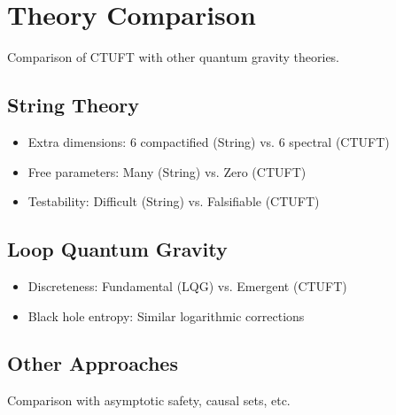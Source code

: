 \section{Theory Comparison}
\label{sec:theory_comparison}

Comparison of CTUFT with other quantum gravity theories.

\subsection{String Theory}

\begin{itemize}
    \item Extra dimensions: 6 compactified (String) vs. 6 spectral (CTUFT)
    \item Free parameters: Many (String) vs. Zero (CTUFT)
    \item Testability: Difficult (String) vs. Falsifiable (CTUFT)
\end{itemize}

\subsection{Loop Quantum Gravity}

\begin{itemize}
    \item Discreteness: Fundamental (LQG) vs. Emergent (CTUFT)
    \item Black hole entropy: Similar logarithmic corrections
\end{itemize}

\subsection{Other Approaches}

Comparison with asymptotic safety, causal sets, etc.
